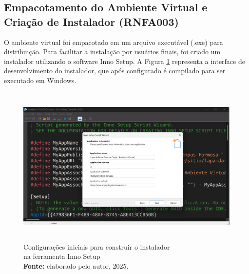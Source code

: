 \subsection{Empacotamento do Ambiente Virtual e Criação de Instalador (RNFA003)}
O ambiente virtual foi empacotado em um arquivo executável (.exe) para distribuição. Para facilitar a instalação por usuários finais, foi criado um instalador utilizando o software Inno Setup. A Figura \ref{fig:configuracao_inno_setup} representa a interface de desenvolvimento do instalador, que após configurado é compilado para ser executado em Windows.

\begin{figure}[H]
        \centering
        \includegraphics[height=8cm, keepaspectratio]{img/Inno setup/configuracao do instalador.png}
        \caption{Configurações iniciais para construir o instalador \\ na ferramenta Inno Setup \\
            \textbf{Fonte:} elaborado pelo autor, 2025.}
        \label{fig:configuracao_inno_setup}
\end{figure}

